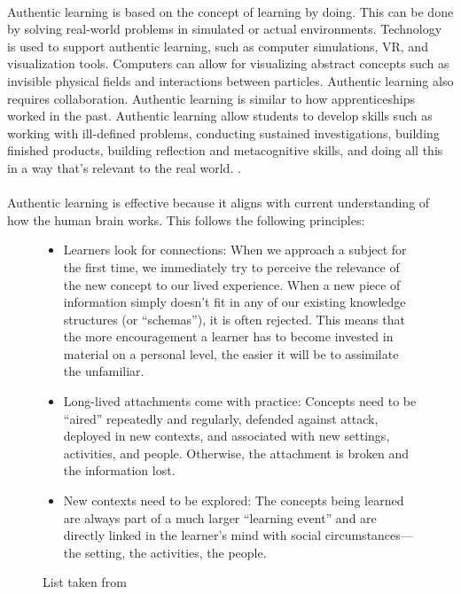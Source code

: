 \paragraph{}Authentic learning is based on the concept of learning by doing. This can be done by solving real-world problems in simulated or actual environments. Technology is used to support authentic learning, such as computer simulations, VR, and visualization tools. Computers can allow for visualizing abstract concepts such as invisible physical fields and interactions between particles. Authentic learning also requires collaboration. Authentic learning is similar to how apprenticeships worked in the past. Authentic learning allow students to develop skills such as working with ill-defined problems, conducting sustained investigations, building finished products, building reflection and metacognitive skills, and doing all this in a way that's relevant to the real world. \autocite{lombardi_authentic_2007}.

\paragraph{}Authentic learning is effective because it aligns with current understanding of how the human brain works. This follows the following principles:

\begin{figure}
\begin{itemize}
    \item Learners look for connections: When we approach a subject for the first time, we immediately try to perceive the relevance of the new concept to our lived experience. When a new piece of information simply doesn’t fit in any of our existing knowledge structures (or “schemas”), it is often rejected. This means that the more encouragement a learner has to become invested in material on a personal level, the easier it will be to assimilate the unfamiliar.
    \item Long-lived attachments come with practice: Concepts need to be “aired” repeatedly and regularly, defended against attack, deployed in new contexts, and associated with new settings, activities, and people. Otherwise, the attachment is broken and the information lost.
    \item New contexts need to be explored: The concepts being learned are always part of a much larger “learning event” and are directly linked in the learner’s mind with social circumstances—the setting, the activities, the people.
\end{itemize}
    \caption{List taken from \textcite{lombardi_authentic_2007}}
    \label{fig:placeholder}
\end{figure}

